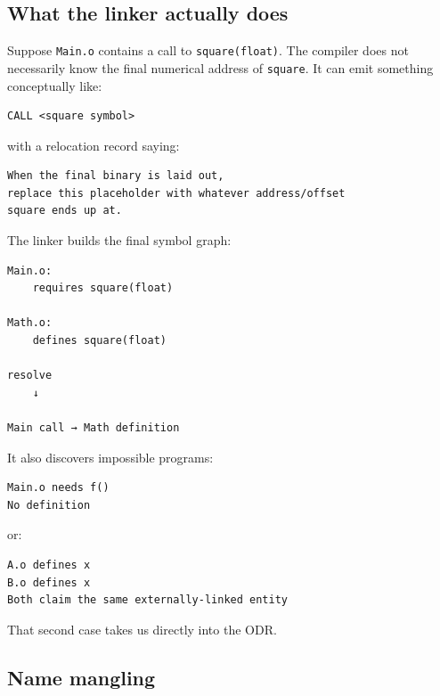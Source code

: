 \subsection{What the linker actually does}\label{05-engine-i-ch002-what-the-linker-actually-does}

\hypertarget{05-engine-i-ch002-what-the-linker-actually-does}{}

Suppose \texttt{Main.o} contains a call to \texttt{square(float)}. The compiler does not necessarily know the final numerical address of \texttt{square}. It can emit something conceptually like:

\begin{verbatim}
CALL <square symbol>
\end{verbatim}

with a relocation record saying:

\begin{verbatim}
When the final binary is laid out,
replace this placeholder with whatever address/offset
square ends up at.
\end{verbatim}

The linker builds the final symbol graph:

\begin{verbatim}
Main.o:
    requires square(float)

Math.o:
    defines square(float)

resolve
    ↓

Main call → Math definition
\end{verbatim}

It also discovers impossible programs:

\begin{verbatim}
Main.o needs f()
No definition
\end{verbatim}

or:

\begin{verbatim}
A.o defines x
B.o defines x
Both claim the same externally-linked entity
\end{verbatim}

That second case takes us directly into the ODR.

\subsection{Name mangling}\label{05-engine-i-ch002-name-mangling}

\hypertarget{05-engine-i-ch002-name-mangling}{}

